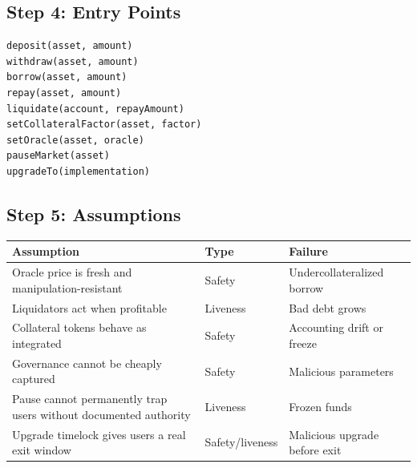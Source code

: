 \subsection{Step 4: Entry Points}

\begin{lstlisting}
deposit(asset, amount)
withdraw(asset, amount)
borrow(asset, amount)
repay(asset, amount)
liquidate(account, repayAmount)
setCollateralFactor(asset, factor)
setOracle(asset, oracle)
pauseMarket(asset)
upgradeTo(implementation)
\end{lstlisting}

\subsection{Step 5: Assumptions}

{\def\LTcaptype{none} %
\begin{longtable}[]{@{}
  >{\raggedright\arraybackslash}p{}
  >{\raggedright\arraybackslash}p{}
  >{\raggedright\arraybackslash}p{}@{}}
\toprule\noalign{}
\begin{minipage}[b]{\linewidth}\raggedright
Assumption
\end{minipage} & \begin{minipage}[b]{\linewidth}\raggedright
Type
\end{minipage} & \begin{minipage}[b]{\linewidth}\raggedright
Failure
\end{minipage} \\
\midrule\noalign{}
\endhead
\bottomrule\noalign{}
\endlastfoot
Oracle price is fresh and manipulation-resistant & Safety &
Undercollateralized borrow \\
Liquidators act when profitable & Liveness & Bad debt grows \\
Collateral tokens behave as integrated & Safety & Accounting drift or
freeze \\
Governance cannot be cheaply captured & Safety & Malicious parameters \\
Pause cannot permanently trap users without documented authority &
Liveness & Frozen funds \\
Upgrade timelock gives users a real exit window & Safety/liveness &
Malicious upgrade before exit \\
\end{longtable}
}

